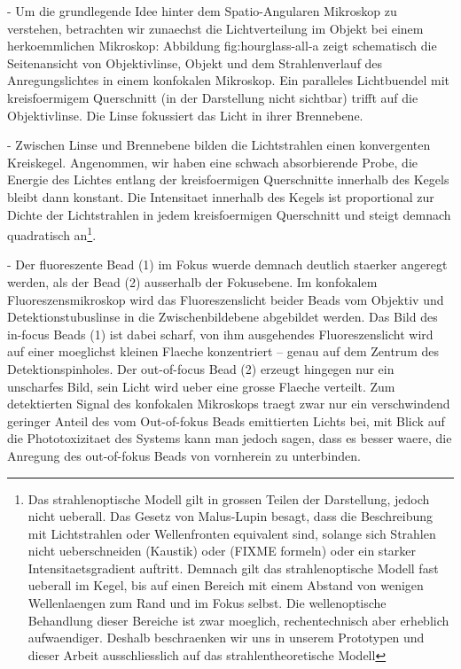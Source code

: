   - Um die grundlegende Idee hinter dem Spatio-Angularen Mikroskop zu
    verstehen, betrachten wir zunaechst die Lichtverteilung im Objekt
    bei einem herkoemmlichen Mikroskop: Abbildung fig:hourglass-all-a
    zeigt schematisch die Seitenansicht von Objektivlinse, Objekt und
    dem Strahlenverlauf des Anregungslichtes in einem konfokalen
    Mikroskop. Ein paralleles Lichtbuendel mit kreisfoermigem
    Querschnitt (in der Darstellung nicht sichtbar) trifft auf die
    Objektivlinse. Die Linse fokussiert das Licht in ihrer Brennebene.

  - Zwischen Linse und Brennebene bilden die Lichtstrahlen einen
    konvergenten Kreiskegel. Angenommen, wir haben eine schwach
    absorbierende Probe, die Energie des Lichtes entlang der
    kreisfoermigen Querschnitte innerhalb des Kegels bleibt dann
    konstant. Die Intensitaet innerhalb des Kegels ist proportional
    zur Dichte der Lichtstrahlen in jedem kreisfoermigen Querschnitt
    und steigt demnach quadratisch an\footnote{Das strahlenoptische
    Modell gilt in grossen Teilen der Darstellung, jedoch nicht
    ueberall.  Das Gesetz von Malus-Lupin besagt, dass die
    Beschreibung mit Lichtstrahlen oder Wellenfronten equivalent sind,
    solange sich Strahlen nicht ueberschneiden (Kaustik) oder (FIXME
    formeln) oder ein starker Intensitaetsgradient auftritt. Demnach
    gilt das strahlenoptische Modell fast ueberall im Kegel, bis auf
    einen Bereich mit einem Abstand von wenigen Wellenlaengen zum Rand
    und im Fokus selbst. Die wellenoptische Behandlung dieser Bereiche
    ist zwar moeglich, rechentechnisch aber erheblich
    aufwaendiger. Deshalb beschraenken wir uns in unserem Prototypen
    und dieser Arbeit ausschliesslich auf das strahlentheoretische
    Modell}.

  - Der fluoreszente Bead (1) im Fokus wuerde demnach deutlich
    staerker angeregt werden, als der Bead (2) ausserhalb der
    Fokusebene. Im konfokalem Fluoreszensmikroskop wird das
    Fluoreszenslicht beider Beads vom Objektiv und
    Detektionstubuslinse in die Zwischenbildebene abgebildet werden.
    Das Bild des in-focus Beads (1) ist dabei scharf, von ihm
    ausgehendes Fluoreszenslicht wird auf einer moeglichst kleinen
    Flaeche konzentriert -- genau auf dem Zentrum des
    Detektionspinholes.  Der out-of-focus Bead (2) erzeugt hingegen
    nur ein unscharfes Bild, sein Licht wird ueber eine grosse Flaeche
    verteilt. Zum detektierten Signal des konfokalen Mikroskops traegt
    zwar nur ein verschwindend geringer Anteil des vom Out-of-fokus
    Beads emittierten Lichts bei, mit Blick auf die Phototoxizitaet
    des Systems kann man jedoch sagen, dass es besser waere, die
    Anregung des out-of-fokus Beads von vornherein zu unterbinden.


